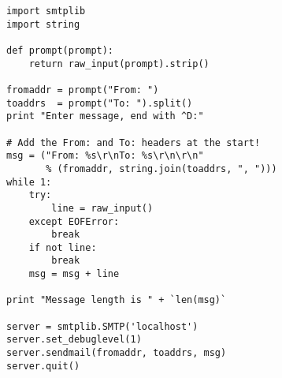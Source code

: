 \begin{verbatim}
import smtplib
import string

def prompt(prompt):
    return raw_input(prompt).strip()

fromaddr = prompt("From: ")
toaddrs  = prompt("To: ").split()
print "Enter message, end with ^D:"

# Add the From: and To: headers at the start!
msg = ("From: %s\r\nTo: %s\r\n\r\n"
       % (fromaddr, string.join(toaddrs, ", ")))
while 1:
    try:
        line = raw_input()
    except EOFError:
        break
    if not line:
        break
    msg = msg + line

print "Message length is " + `len(msg)`

server = smtplib.SMTP('localhost')
server.set_debuglevel(1)
server.sendmail(fromaddr, toaddrs, msg)
server.quit()
\end{verbatim}
